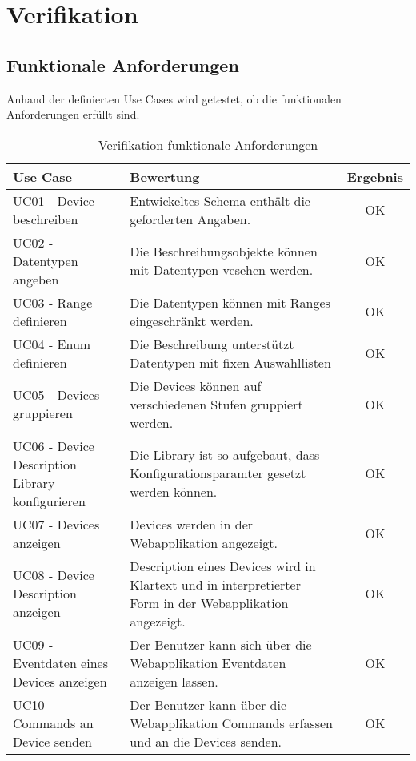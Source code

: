 \chapter{Verifikation}
\label{chap:verification}

\section{Funktionale Anforderungen}
Anhand der definierten Use Cases wird getestet, ob die funktionalen Anforderungen erfüllt sind.

\begin{table}[H]
\begin{tabularx}{\textwidth}{|l|X|c|}

 \hline \rowcolor{lightgray}
 {\bf Use Case } & {\bf Bewertung } & {\bf Ergebnis} \\  \hline
 
 UC01 - Device beschreiben & Entwickeltes Schema enthält die geforderten Angaben. & OK \\ \hline

 UC02 - Datentypen angeben   & Die Beschreibungsobjekte können mit Datentypen vesehen werden. & OK \\ \hline

 UC03 - Range definieren    & Die Datentypen können mit Ranges eingeschränkt werden. & OK \\ \hline

 UC04 - Enum definieren     & Die Beschreibung unterstützt Datentypen mit fixen Auswahllisten & OK \\ \hline

 UC05 - Devices gruppieren & Die Devices können auf verschiedenen Stufen gruppiert werden. & OK \\ \hline

 UC06 - Device Description Library konfigurieren & Die Library ist so aufgebaut, dass  Konfigurationsparamter gesetzt werden können. & OK \\ \hline

 UC07 - Devices anzeigen & Devices werden in der Webapplikation angezeigt. & OK \\ \hline

 UC08 - Device Description anzeigen & Description eines Devices wird in Klartext und in interpretierter Form in der Webapplikation angezeigt. & OK \\ \hline

 UC09 - Eventdaten eines Devices anzeigen & Der Benutzer kann sich über die Webapplikation Eventdaten anzeigen lassen. & OK \\ \hline

 UC10 - Commands an Device senden & Der Benutzer kann über die Webapplikation Commands erfassen und an die Devices senden. & OK \\ \hline

\end{tabularx}
\caption{Verifikation funktionale Anforderungen}
\end{table}






